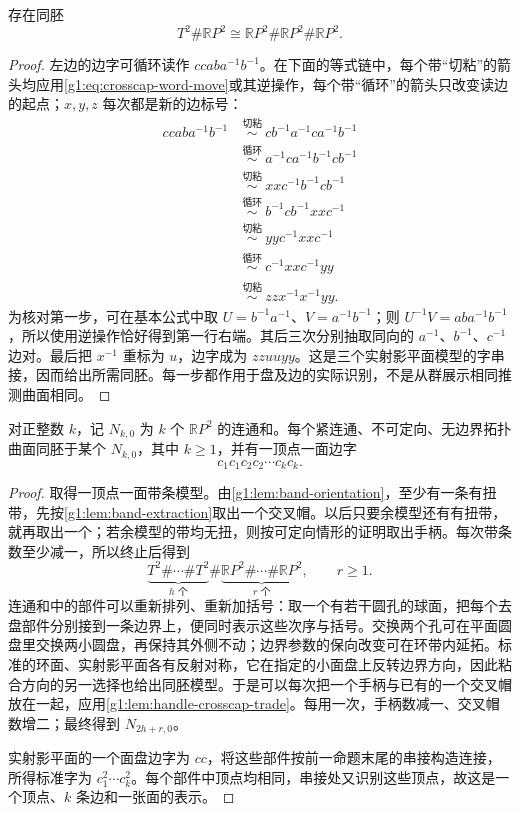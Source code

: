 \begin{lemma}\label{g1:lem:handle-crosscap-trade}
	存在同胚
	\[
		T^2\#\mathbb RP^2\cong\mathbb RP^2\#\mathbb RP^2\#\mathbb RP^2.
	\]
\end{lemma}
\begin{proof}
	左边的边字可循环读作 \(ccaba^{-1}b^{-1}\)。在下面的等式链中，每个带“切粘”的箭头均应用\cref{g1:eq:crosscap-word-move}或其逆操作，每个带“循环”的箭头只改变读边的起点；\(x,y,z\) 每次都是新的边标号：
	\begin{align*}
		ccaba^{-1}b^{-1}
		&\ \overset{\text{切粘}}{\sim}\ cb^{-1}a^{-1}ca^{-1}b^{-1}\\
		&\ \overset{\text{循环}}{\sim}\ a^{-1}ca^{-1}b^{-1}cb^{-1}\\
		&\ \overset{\text{切粘}}{\sim}\ xxc^{-1}b^{-1}cb^{-1}\\
		&\ \overset{\text{循环}}{\sim}\ b^{-1}cb^{-1}xxc^{-1}\\
		&\ \overset{\text{切粘}}{\sim}\ yyc^{-1}xxc^{-1}\\
		&\ \overset{\text{循环}}{\sim}\ c^{-1}xxc^{-1}yy\\
		&\ \overset{\text{切粘}}{\sim}\ zzx^{-1}x^{-1}yy.
	\end{align*}
	为核对第一步，可在基本公式中取 \(U=b^{-1}a^{-1}\)、\(V=a^{-1}b^{-1}\)；则 \(U^{-1}V=aba^{-1}b^{-1}\)，所以使用逆操作恰好得到第一行右端。其后三次分别抽取同向的 \(a^{-1}\)、\(b^{-1}\)、\(c^{-1}\) 边对。最后把 \(x^{-1}\) 重标为 \(u\)，边字成为 \(zzuuyy\)。这是三个实射影平面模型的字串接，因而给出所需同胚。每一步都作用于盘及边的实际识别，不是从群展示相同推测曲面相同。
\end{proof}

\begin{proposition}\label{g1:prop:nonorientable-standard-word}
	对正整数 \(k\)，记 \(N_{k,0}\) 为 \(k\) 个 \(\mathbb RP^2\) 的连通和。每个紧连通、不可定向、无边界拓扑曲面同胚于某个 \(N_{k,0}\)，其中 \(k\ge1\)，并有一顶点一面边字
	\[
		c_1c_1c_2c_2\cdots c_kc_k.
	\]
\end{proposition}
\begin{proof}
	取得一顶点一面带条模型。由\cref{g1:lem:band-orientation}，至少有一条有扭带，先按\cref{g1:lem:band-extraction}取出一个交叉帽。以后只要余模型还有有扭带，就再取出一个；若余模型的带均无扭，则按可定向情形的证明取出手柄。每次带条数至少减一，所以终止后得到
	\[
		\underbrace{T^2\#\cdots\#T^2}_{h\text{ 个}}\#\underbrace{\mathbb RP^2\#\cdots\#\mathbb RP^2}_{r\text{ 个}},\qquad r\ge1.
	\]
	连通和中的部件可以重新排列、重新加括号：取一个有若干圆孔的球面，把每个去盘部件分别接到一条边界上，便同时表示这些次序与括号。交换两个孔可在平面圆盘里交换两小圆盘，再保持其外侧不动；边界参数的保向改变可在环带内延拓。标准的环面、实射影平面各有反射对称，它在指定的小面盘上反转边界方向，因此粘合方向的另一选择也给出同胚模型。于是可以每次把一个手柄与已有的一个交叉帽放在一起，应用\cref{g1:lem:handle-crosscap-trade}。每用一次，手柄数减一、交叉帽数增二；最终得到 \(N_{2h+r,0}\)。

	实射影平面的一个面盘边字为 \(cc\)，将这些部件按前一命题末尾的串接构造连接，所得标准字为 \(c_1^2\cdots c_k^2\)。每个部件中顶点均相同，串接处又识别这些顶点，故这是一个顶点、\(k\) 条边和一张面的表示。
\end{proof}

